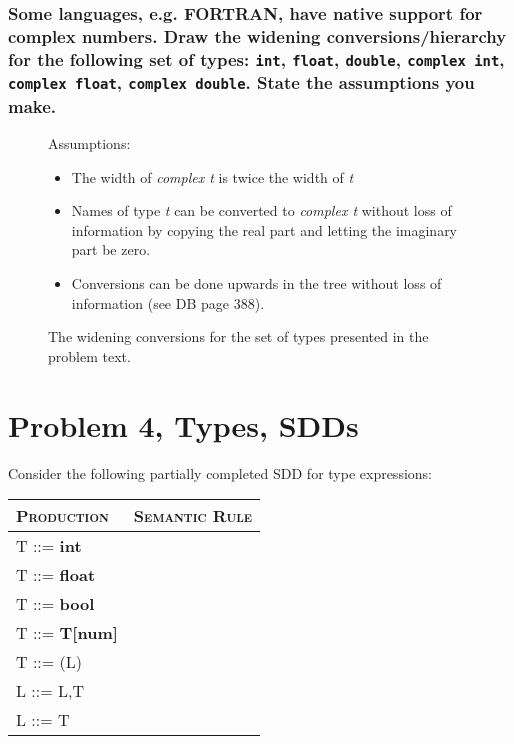 \subsubsection{Some languages, e.g. FORTRAN, have native support for complex numbers. Draw the widening conversions/hierarchy for the following set of types: \texttt{int}, \texttt{float}, \texttt{double}, \texttt{complex int}, \texttt{complex float}, \texttt{complex double}. State the assumptions you make.}
\begin{figure}[H]
Assumptions: 
\begin{itemize}
	\item The width of \emph{complex t} is twice the width of \emph{t} 
	\item Names of type \emph{t} can be converted to \emph{complex t} without loss of information by copying the real part and letting the imaginary part be zero.
	\item Conversions can be done upwards in the tree without loss of information (see \textsc{DB} page 388).
\end{itemize}
\end{figure}

\begin{figure}[H]
\caption{The widening conversions for the set of types presented in the problem text.}
\label{fig:3-b}
\end{figure}

\newpage
\setcounter{subsubsection}{0}
\section{Problem 4, Types, SDDs}
Consider the following partially completed SDD for type expressions:
\begin{table}[H]
\begin{tabular}{ll}
	\textsc{Production} & \textsc{Semantic Rule} \\ \hline
	T ::= \textbf{int}	&						\\
	T ::= \textbf{float}& \\
	T ::= \textbf{bool} & \\
	T ::= \textbf{T[num]}& \\
	T ::= (L) 			& \\
	L ::= L,T			& \\
	L ::= T				& \\
\end{tabular}
\end{table}


